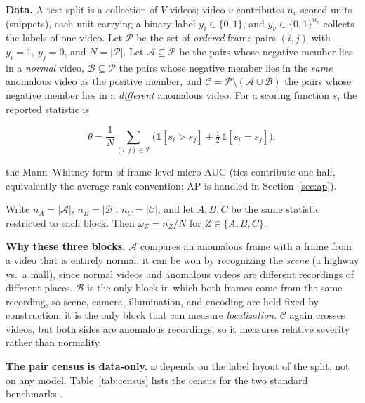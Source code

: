 \documentclass[number,preprint,12pt]{elsarticle}
\begin{document}
\textbf{Data.} A test split is a collection of \(V\) videos; video \(v\) contributes
\(n_v\) scored units (snippets), each unit carrying a binary label
\(y_i\in\{0,1\}\), and \(y_v\in\{0,1\}^{n_v}\) collects the labels of one video. Let \(\mathcal{P}\) be the set of \emph{ordered} frame pairs
\((i, j)\) with \(y_i=1,\ y_j=0\), and \(N=|\mathcal{P}|\). Let \(\mathcal{A}\subseteq\mathcal{P}\) be the pairs whose
negative member lies in a \emph{normal} video, \(\mathcal{B}\subseteq\mathcal{P}\) the pairs whose negative member
lies in the \emph{same} anomalous video as the positive member, and \(\mathcal{C}=\mathcal{P}\setminus(\mathcal{A}\cup\mathcal{B})\)
the pairs whose negative member lies in a \emph{different} anomalous video. For a
scoring function \(s\), the reported statistic is

\begin{equation}
\theta=\frac{1}{N}\sum_{(i,j)\in\mathcal{P}}\Big(\mathbb{1}[s_i>s_j]+\tfrac{1}{2}\,\mathbb{1}[s_i=s_j]\Big),
\label{eq:theta}
\end{equation}

the Mann--Whitney form of frame-level micro-AUC \citep{hanley1982meaning} (ties contribute one half,
equivalently the average-rank convention; AP is
handled in Section~\ref{sec:ap}).

Write \(n_A=|\mathcal{A}|\), \(n_B=|\mathcal{B}|\), \(n_C=|\mathcal{C}|\), and let \(A, B, C\) be the same
statistic restricted to each block. Then \(\omega_Z=n_Z/N\) for \(Z\in\{A,B,C\}\).

\textbf{Why these three blocks.} \(\mathcal{A}\) compares an anomalous frame with a frame from a
video that is entirely normal: it can be won by recognizing the \emph{scene} (a
highway vs.~a mall), since normal videos and anomalous videos are different
recordings of different places. \(\mathcal{B}\) is the only block in which both frames come
from the same recording, so scene, camera, illumination, and encoding are held
fixed by construction: it is the only block that can measure \emph{localization}.
\(\mathcal{C}\) again crosses videos, but both sides are anomalous recordings, so it
measures relative severity rather than normality.

\textbf{The pair census is data-only.} \(\omega\) depends on the label layout of the split,
not on any model. Table~\ref{tab:census} lists the census for the two standard benchmarks \citep{sultani2018realworld,wu2020xdviolence}.
\end{document}
